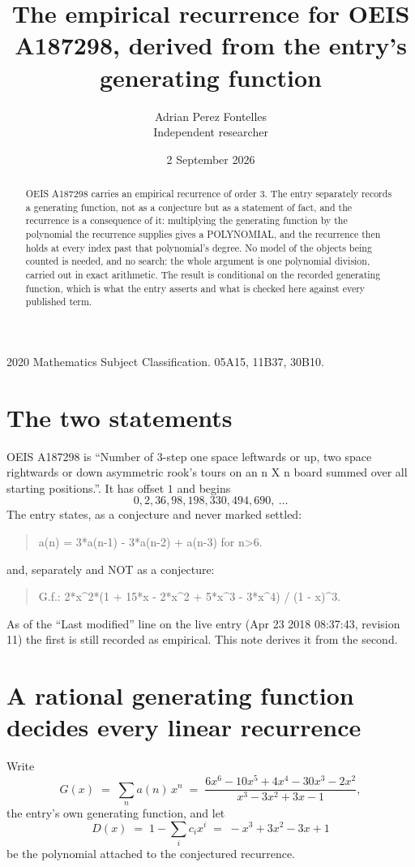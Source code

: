 \documentclass[11pt,a4paper]{article}
\title{The empirical recurrence for OEIS A187298, derived from the entry's generating function}
\author{Adrian Perez Fontelles\\ \small Independent researcher}
\date{2 September 2026}
\theoremstyle{plain}
\theoremstyle{definition}
\begin{document}
\maketitle

\begin{abstract}
OEIS A187298 carries an empirical recurrence of order $3$. The entry separately records a
generating function, not as a conjecture but as a statement of fact, and the recurrence is a
consequence of it: multiplying the generating function by the polynomial the recurrence
supplies gives a POLYNOMIAL, and the recurrence then holds at every index past that
polynomial's degree. No model of the objects being counted is needed, and no search: the
whole argument is one polynomial division, carried out in exact arithmetic. The result is
conditional on the recorded generating function, which is what the entry asserts and what is
checked here against every published term.
\end{abstract}

\noindent\small 2020 Mathematics Subject Classification. 05A15, 11B37, 30B10.\normalsize

\section{The two statements}

OEIS A187298 is ``Number of 3-step one space leftwards or up, two space rightwards or down asymmetric rook's tours on an n X n board summed over all starting positions.''. It has offset $1$ and begins
\[
0, 2, 36, 98, 198, 330, 494, 690,\ \dots
\]
The entry states, as a conjecture and never marked settled:
\begin{quote}
a(n) = 3*a(n-1) - 3*a(n-2) + a(n-3) for n>6.
\end{quote}
and, separately and NOT as a conjecture:
\begin{quote}
G.f.: 2*x\^{}2*(1 + 15*x - 2*x\^{}2 + 5*x\^{}3 - 3*x\^{}4) / (1 - x)\^{}3.
\end{quote}
As of the ``Last modified'' line on the live entry (Apr 23 2018 08:37:43, revision 11) the first is still
recorded as empirical. This note derives it from the second.

\section{A rational generating function decides every linear recurrence}

Write
\[
G(x)\;=\;\sum_{n}a(n)\,x^{n}\;=\;\frac{6 x^{6} - 10 x^{5} + 4 x^{4} - 30 x^{3} - 2 x^{2}}{x^{3} - 3 x^{2} + 3 x - 1},
\]
the entry's own generating function, and let
\[
D(x)\;=\;1-\sum_i c_i x^{i}\;=\;- x^{3} + 3 x^{2} - 3 x + 1
\]
be the polynomial attached to the conjectured recurrence.
\end{document}
